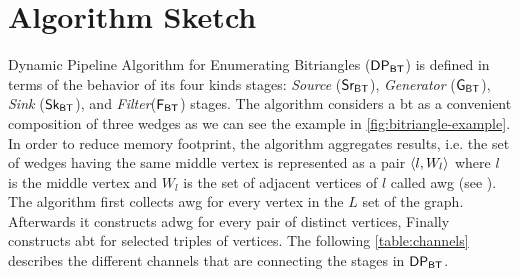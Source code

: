\section{Algorithm Sketch}\label{sub:sec:algo-sketch}
Dynamic Pipeline Algorithm for Enumerating Bitriangles ($\mathsf{DP_{BT}}$) is defined in terms of the behavior of its four kinds stages: \textit{Source} ($\mathsf{Sr_{BT}}$),  
\textit{Generator} ($\mathsf{G_{BT}}$),  \textit{Sink} ($\mathsf{Sk_{BT}}$), and \textit{Filter}($\mathsf{F_{BT}}$) stages. 
The algorithm considers a \acrlong{bt} as a convenient composition of three wedges as we can see the example in \autoref{fig:bitriangle-example}.
In order to reduce memory footprint, the algorithm aggregates results, i.e. the set of wedges having the same middle vertex is represented as a pair $\left\langle l, W_l \right\rangle$ where $l$ is the middle vertex and $W_l$ is the set of adjacent vertices of $l$ called \acrfull{awg} (see ).
The algorithm first collects \acrshort{awg} for every vertex in the $L$ set of the graph. Afterwards it constructs \acrfull{adwg} for every pair of distinct vertices, Finally  constructs \acrshort{abt}  for selected triples of vertices. 
The following \autoref{table:channels} describes the different channels that are connecting the stages in $\mathsf{DP_{BT}}$.

